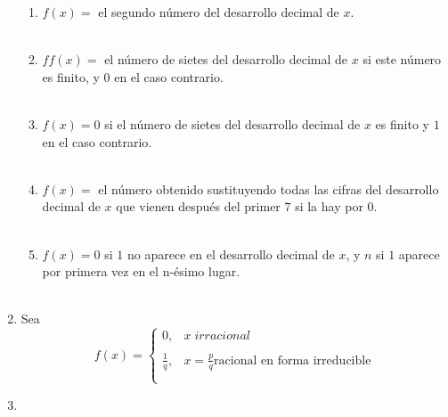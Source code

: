 \begin{enumerate}
\begin{enumerate}[\bfseries (i)]
	\item $f(x)=$ el segundo número del desarrollo decimal de $x$.\\\\

	\item $ff(x)=$ el número de sietes del desarrollo decimal de $x$ si este número es finito, y $0$ en el caso contrario.\\\\

	\item $f(x)=0$ si el número de sietes del desarrollo decimal de $x$ es finito y $1$ en el caso contrario.\\\\

	\item $f(x)=$ el número obtenido sustituyendo todas las cifras del desarrollo decimal de $x$ que vienen después del primer $7$ si la hay por $0$.\\\\

	\item $f(x)=0$ si $1$ no aparece en el desarrollo decimal de $x$, y $n$ si $1$ aparece por primera vez en el n-ésimo lugar.\\\\
    \end{enumerate}

    \item Sea $$f(x)=\left\{ \begin{array}{rl}
	0,&x \; irracional\\
	\\ \frac{1}{q},& x=\frac{p}{q} \mbox{racional en forma irreducible}\\\\
    \end{array}\right.$$

    \item 

\end{enumerate}
